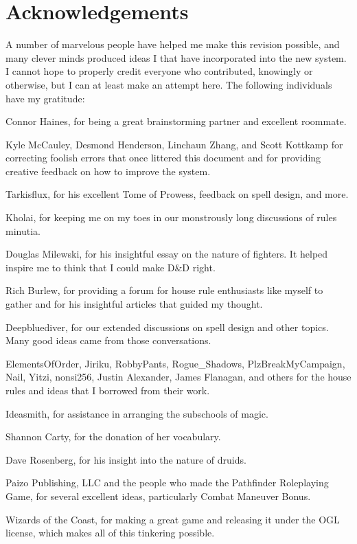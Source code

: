 \chapter*{Acknowledgements}
A number of marvelous people have helped me make this revision possible, and many clever minds produced ideas I that have incorporated into the new system. I cannot hope to properly credit everyone who contributed, knowingly or otherwise, but I can at least make an attempt here. The following individuals have my gratitude:

Connor Haines, for being a great brainstorming partner and excellent roommate.

Kyle McCauley, Desmond Henderson, Linchaun Zhang, and Scott Kottkamp for correcting foolish errors that once littered this document and for providing creative feedback on how to improve the system.

Tarkisflux, for his excellent Tome of Prowess, feedback on spell design, and more.

Kholai, for keeping me on my toes in our monstrously long discussions of rules minutia.

Douglas Milewski, for his insightful essay on the nature of fighters. It helped inspire me to think that I could make D\&D right.

Rich Burlew, for providing a forum for house rule enthusiasts like myself to gather and for his insightful articles that guided my thought.

Deepbluediver, for our extended discussions on spell design and other topics. Many good ideas came from those conversations.

ElementsOfOrder, Jiriku, RobbyPants, Rogue\_Shadows, PlzBreakMyCampaign, Nail, Yitzi, nonsi256, Justin Alexander, James Flanagan, and others for the house rules and ideas that I borrowed from their work.

Ideasmith, for assistance in arranging the subschools of magic.

Shannon Carty, for the donation of her vocabulary.

Dave Rosenberg, for his insight into the nature of druids.

Paizo Publishing, LLC and the people who made the Pathfinder Roleplaying Game, for several excellent ideas, particularly Combat Maneuver Bonus.

Wizards of the Coast, for making a great game and releasing it under the OGL license, which makes all of this tinkering possible.
